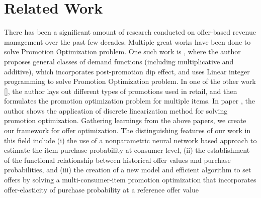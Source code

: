 \section{Related Work}
\label{sec:relatedwork}
There has been a significant amount of research conducted on offer-based revenue management over the past few decades.
Multiple great works have been done to solve Promotion Optimization problem.
One such work is \cite{cohen2017impact}, where the
author proposes general classes of demand functions (including multiplicative and additive), which incorporates
post-promotion dip effect, and uses Linear integer programming to solve Promotion Optimization problem.
In one of the other work [\cite{cohen2018promotion}], the author lays out different types of promotions
used in retail, and then formulates the promotion optimization problem for multiple items.
In paper \cite{cohen2018promotion}, the author shows the application of discrete linearization method for solving 
promotion optimization. Gathering learnings from the above papers, we create our framework for offer optimization.
The distinguishing features of our work in this field include 
(i) the use of a nonparametric neural network based approach to estimate the item purchase probability at consumer level,
(ii) the establishment of the functional relationship between historical offer values and purchase probabilities, and
(iii) the creation of a new model and efficient algorithm to set offers by solving a multi-consumer-item promotion
optimization that incorporates offer-elasticity of purchase probability at a reference offer value
